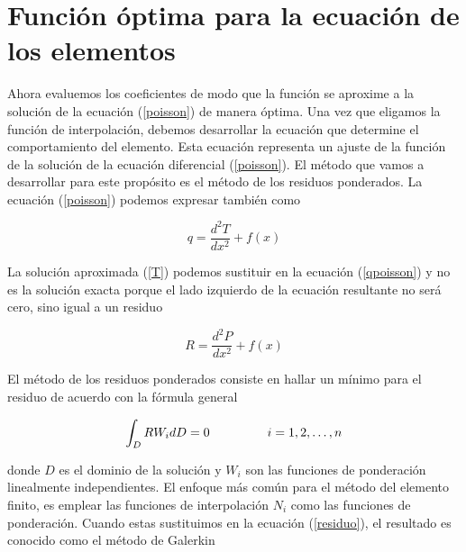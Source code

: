 \documentclass[10pt,a4paper]{article}
\begin{document}
\section{Funci\'on \'optima para la ecuaci\'on de los elementos}

Ahora evaluemos los coeficientes de modo que la funci\'on se aproxime a la soluci\'on de la ecuaci\'on (\ref{poisson}) de manera \'optima. Una vez que eligamos la funci\'on de interpolaci\'on, debemos desarrollar la ecuaci\'on que determine el comportamiento del elemento. Esta ecuaci\'on representa un ajuste de la funci\'on de la soluci\'on de la ecuaci\'on diferencial (\ref{poisson}). El m\'etodo que vamos a desarrollar para este prop\'osito es el m\'etodo de los residuos ponderados. La ecuaci\'on (\ref{poisson}) podemos expresar tambi\'en como 

\begin{equation}\label{qpoisson}
 q=\frac{d^2T}{dx^2}+f(x)
\end{equation}

La soluci\'on aproximada (\ref{T}) podemos sustituir en la ecuaci\'on (\ref{qpoisson}) y no es la soluci\'on exacta porque el lado izquierdo de la ecuaci\'on resultante no ser\'a cero, sino igual a un residuo

\begin{equation}\label{Rpoisson}
 R=\frac{d^2P}{dx^2}+f(x)
\end{equation}
 
El m\'etodo de los residuos ponderados consiste en hallar un m\'inimo para el residuo de acuerdo con la f\'ormula general 

\begin{equation}\label{residuo}
  \displaystyle \int_DRW_idD=0 \hspace*{0.9cm} \mbox { } \hspace*{0.6cm} i=1,2,\dots,n
\end{equation}
 
\noindent donde $D$ es el dominio de la soluci\'on y $W_i$ son las funciones de ponderaci\'on linealmente independientes. El enfoque m\'as com\'un para el m\'etodo del elemento finito, es emplear las funciones de interpolaci\'on $N_i$ como las funciones de ponderaci\'on. Cuando estas sustituimos en la ecuaci\'on (\ref{residuo}), el resultado es conocido como el m\'etodo de Galerkin
\end{document}
